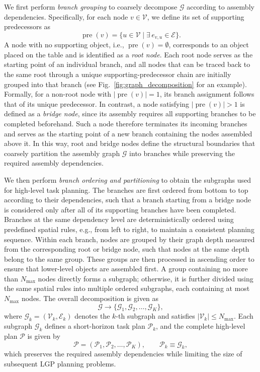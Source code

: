 \documentclass[letterpaper, 10 pt, conference]{ieeeconf}  %
\begin{document}
We first perform \textit{branch grouping} to coarsely decompose $\mathcal{G}$ according to assembly dependencies. 
Specifically, for each node $v\in\mathcal{V}$, we define its set of supporting predecessors as
\begin{equation}
\operatorname{pre}(v)=\{u\in\mathcal{V}\mid \exists \, e_{v,u}\in\mathcal{E}\}.
\end{equation}
A node with no supporting object, i.e., $\operatorname{pre}(v)=\emptyset$, corresponds to an object placed on the table and is identified as a \textit{root node}. 
Each root node serves as the starting point of an individual branch, and all nodes that can be traced back to the same root through a unique supporting-predecessor chain are initially grouped into that branch (see Fig.~\ref{fig:graph_decomposition} for an example).
Formally, for a non-root node with $|\operatorname{pre}(v)|=1$, its branch assignment follows that of its unique predecessor. 
In contrast, a node satisfying $|\operatorname{pre}(v)|>1$ is defined as a \textit{bridge node}, since its assembly requires all supporting branches to be completed beforehand. 
Such a node therefore terminates its incoming branches and serves as the starting point of a new branch containing the nodes assembled above it.
In this way, root and bridge nodes define the structural boundaries that coarsely partition the assembly graph $\mathcal{G}$ into branches while preserving the required assembly dependencies.

We then perform \textit{branch ordering and partitioning} to obtain the subgraphs used for high-level task planning.
The branches are first ordered from bottom to top according to their dependencies, such that a branch starting from a bridge node is considered only after all of its supporting branches have been completed.
Branches at the same dependency level are deterministically ordered using predefined spatial rules, e.g., from left to right, to maintain a consistent planning sequence.
Within each branch, nodes are grouped by their graph depth measured from the corresponding root or bridge node, such that nodes at the same depth belong to the same group. 
These groups are then processed in ascending order to ensure that lower-level objects are assembled first. 
A group containing no more than $N_{\max}$ nodes directly forms a subgraph; otherwise, it is further divided using the same spatial rules into multiple ordered subgraphs, each containing at most $N_{\max}$ nodes.
The overall decomposition is given as
\begin{equation}
\mathcal{G}\rightarrow \{\mathcal{G}_1,\mathcal{G}_2,\ldots,\mathcal{G}_K\},
\end{equation}
where $\mathcal{G}_k=(\mathcal{V}_k,\mathcal{E}_k)$ denotes the $k$-th subgraph and satisfies $|\mathcal{V}_k|\leq N_{\max}$.
Each subgraph $\mathcal{G}_k$ defines a short-horizon task plan $\mathcal{P}_k$, and the complete high-level plan $\mathcal{P}$ is given by
\begin{equation}
\mathcal{P} = (\mathcal{P}_1,\mathcal{P}_2,\ldots,\mathcal{P}_K), \qquad \mathcal{P}_k \equiv \mathcal{G}_k,
\end{equation}
which preserves the required assembly dependencies while limiting the size of subsequent LGP planning problems.
\end{document}
